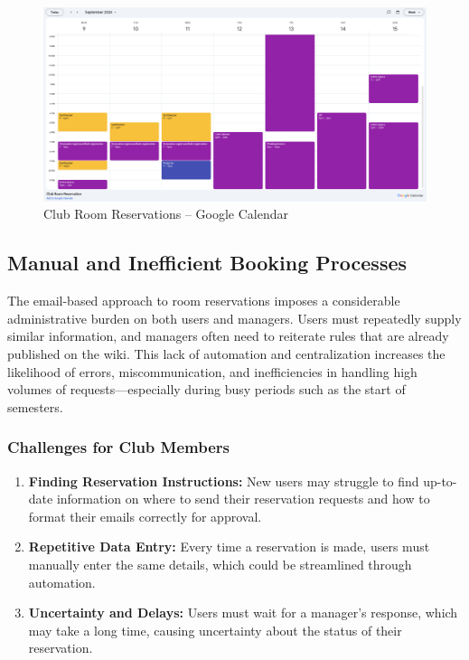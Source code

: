 \begin{figure}[!htbp]
  \centering
  \includegraphics[width=\linewidth]{images/res-google-calendar}
  \caption{Club Room Reservations -- Google Calendar~\cite{googleCalendar}}
  \label{fig:ReservationGoogleCalendarOld}
\end{figure}

\subsection{Manual and Inefficient Booking Processes}

The email-based approach to room reservations imposes a considerable administrative burden on both users and managers. Users must repeatedly supply similar information, and managers often need to reiterate rules that are already published on the wiki. This lack of automation and centralization increases the likelihood of errors, miscommunication, and inefficiencies in handling high volumes of requests—especially during busy periods such as the start of semesters.

\subsubsection{Challenges for Club Members}
\begin{enumerate}
  \item \textbf{Finding Reservation Instructions:} New users may struggle to find up-to-date information on where to send their reservation requests and how to format their emails correctly for approval.
  \item \textbf{Repetitive Data Entry:} Every time a reservation is made, users must manually enter the same details, which could be streamlined through automation.
  \item \textbf{Uncertainty and Delays:} Users must wait for a manager’s response, which may take a long time, causing uncertainty about the status of their reservation.
\end{enumerate}

